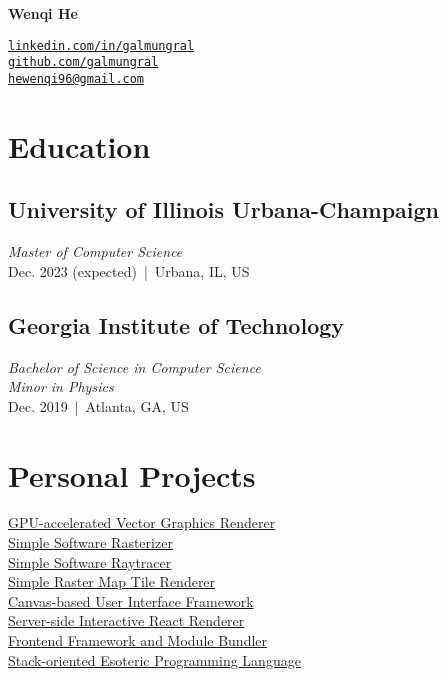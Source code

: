 \documentclass[11pt]{article}
\begin{document}
 
\centering

\begin{minipage}{250pt}
{\Huge\bf Wenqi He}

\vspace{10pt}
\texttt{\href{https://linkedin.com/in/galmungral}{linkedin.com/in/galmungral}\\
\href{https://github.com/galmungral}{github.com/galmungral}\\
\href{mailto:hewenqi96@gmail.com}{hewenqi96@gmail.com}
}


\section*{\sc Education}

\subsection*{University of Illinois Urbana-Champaign}
\textit{Master of Computer Science}\\
Dec. 2023 (expected) \,|\, Urbana, IL, US

\subsection*{Georgia Institute of Technology}
\textit{Bachelor of Science in Computer Science}\\
\textit{Minor in Physics}\\
Dec. 2019 \,|\, Atlanta, GA, US

\section*{\sc Personal Projects}

\href{https://github.com/galmungral/polyrender}{GPU-accelerated Vector Graphics Renderer}\\
\href{https://github.com/galmungral/rasterizer}{Simple Software Rasterizer}\\
\href{https://github.com/galmungral/simple-raytracer}{Simple Software Raytracer}\\
\href{https://github.com/galmungral/mercator}{Simple Raster Map Tile Renderer}\\
\href{https://github.com/galmungral/michelangelo}{Canvas-based User Interface Framework}\\
\href{https://github.com/galmungral/react-teletype}{Server-side Interactive React Renderer} \\
\href{https://github.com/galmungral/replay}{Frontend Framework and Module Bundler}\\
\href{https://github.com/galmungral/hanbun-lang}{Stack-oriented Esoteric Programming Language}



\end{minipage}
\end{document}
